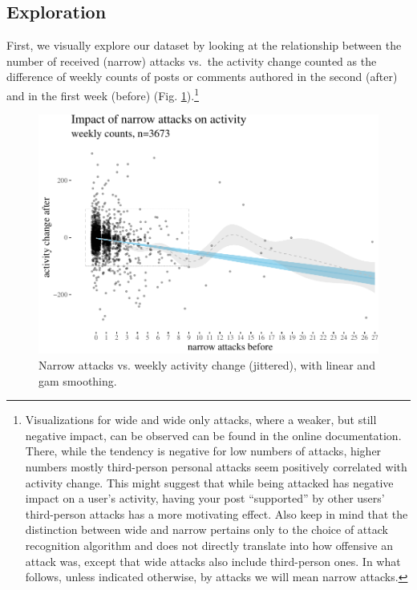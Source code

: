 \documentclass[10pt,dvipsnames]{scrartcl}
\begin{document}
\subsection{Exploration}

First, we visually explore our dataset by looking at the relationship
between the number of received (narrow) attacks vs.~the activity change
counted as the difference of weekly counts of posts or comments authored
in the second (\textsf{after}) and in the first week (\textsf{before})
(Fig. \ref{fig:highPlots}).\footnote{Visualizations for \textsf{wide}
  and \textsf{wide only} attacks, where a weaker, but still negative
  impact, can be observed can be found in the online documentation.
  There, while the tendency is negative for low numbers of attacks,
  higher numbers mostly third-person personal attacks seem positively
  correlated with activity change. This might suggest that while being
  attacked has negative impact on a user's activity, having your post
  ``supported'' by other users' third-person attacks has a more
  motivating effect. Also keep in mind that the distinction between wide
  and narrow pertains only to the choice of attack recognition algorithm
  and does not directly translate into how offensive an attack was,
  except that \textsf{wide} attacks also include third-person ones. In
  what follows, unless indicated otherwise, by attacks we will mean
  narrow attacks.}

\footnotesize

\normalsize

\begin{figure}

\begin{center}\includegraphics[width=0.85\linewidth]{quittingShortAbridgedRevisions2_files/figure-latex/unnamed-chunk-3-1} \end{center}
\caption{Narrow attacks vs. weekly activity change (jittered), with  linear and gam smoothing.}
\label{fig:highPlots}
\end{figure}
\end{document}
